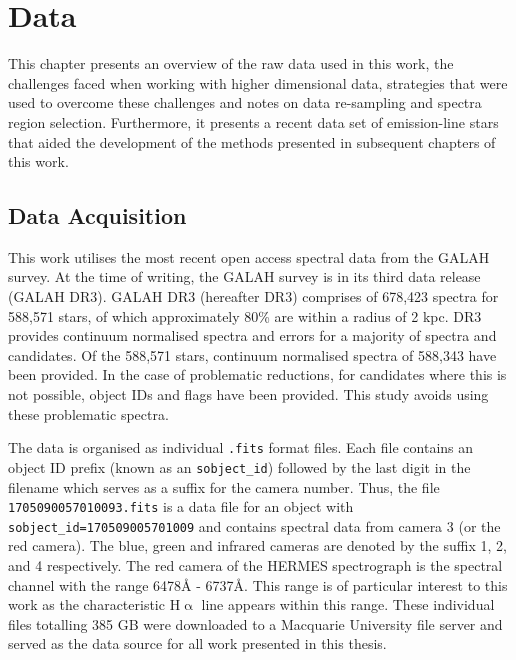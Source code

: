 \chapter{Data}

This chapter presents an overview of the raw data used in this work, the challenges faced when working with higher dimensional data, strategies that were used to overcome these challenges and notes on data re-sampling and spectra region selection. Furthermore, it presents a recent data set of emission-line stars that aided the development of the methods presented in subsequent chapters of this work.

\section{Data Acquisition}

This work utilises the most recent open access spectral data from the GALAH survey. At the time of writing, the GALAH survey is in its third data release (GALAH DR3). GALAH DR3 (hereafter DR3) comprises of 678,423 spectra for 588,571 stars, of which approximately 80\% are within a radius of 2 kpc\cite{buder2021galah+}. DR3 provides continuum normalised spectra and errors for a majority of spectra and candidates. Of the 588,571 stars, continuum normalised spectra of 588,343 have been provided. In the case of problematic reductions, for candidates where this is not possible, object IDs and flags have been provided. This study avoids using these problematic spectra.

The data is organised as individual \texttt{.fits} format files. Each file contains an object ID prefix (known as an \texttt{sobject\_id}) followed by the last digit in the filename which serves as a suffix for the camera number. Thus, the file \texttt{1705090057010093.fits} is a data file for an object with \texttt{sobject\_id=170509005701009} and contains spectral data from camera 3 (or the red camera). The blue, green and infrared cameras are denoted by the suffix 1, 2, and 4 respectively.
The red camera of the HERMES spectrograph is the spectral channel with the range 6478\r{A} - 6737\r{A}\cite{sheinis2014first}. This range is of particular interest to this work as the characteristic H$\upalpha$ line appears within this range. These individual files totalling 385 GB were downloaded to a Macquarie University file server and served as the data source for all work presented in this thesis.

